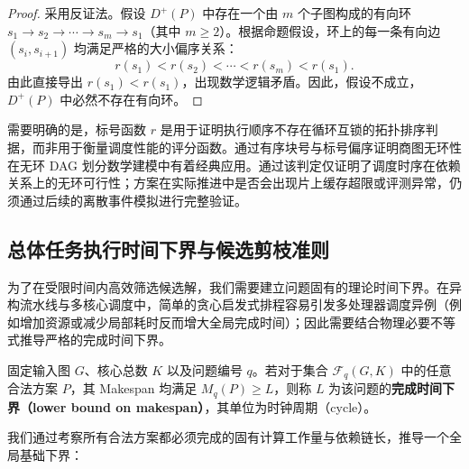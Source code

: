 \documentclass[anonymous,notoc]{gmcm2026}
\begin{document}
\begin{proof} 采用反证法。假设 \(D^+(P)\) 中存在一个由 \(m\) 个子图构成的有向环 \(s_1 \to s_2 \to \cdots \to s_m \to s_1\)（其中 \(m \ge 2\)）。根据命题假设，环上的每一条有向边 \((s_i, s_{i+1})\) 均满足严格的大小偏序关系： \begin{equation}
r(s_1) < r(s_2) < \cdots < r(s_m) < r(s_1).
\end{equation} 由此直接导出 \(r(s_1) < r(s_1)\)，出现数学逻辑矛盾。因此，假设不成立，\(D^+(P)\) 中必然不存在有向环。 \end{proof}

需要明确的是，标号函数 \(r\) 是用于证明执行顺序不存在循环互锁的拓扑排序判据，而非用于衡量调度性能的评分函数。通过有序块号与标号偏序证明商图无环性在无环 DAG 划分数学建模中有着经典应用\cite{ref7}。通过该判定仅证明了调度时序在依赖关系上的无环可行性；方案在实际推进中是否会出现片上缓存超限或评测异常，仍须通过后续的离散事件模拟进行完整验证。

\subsection{总体任务执行时间下界与候选剪枝准则}

为了在受限时间内高效筛选候选解，我们需要建立问题固有的理论时间下界。在异构流水线与多核心调度中，简单的贪心启发式排程容易引发多处理器调度异例（例如增加资源或减少局部耗时反而增大全局完成时间）\cite{ref2}；因此需要结合物理必要不等式推导严格的完成时间下界。

固定输入图 \(G\)、核心总数 \(K\) 以及问题编号 \(q\)。若对于集合 \(\mathcal{F}_q(G, K)\) 中的任意合法方案 \(P\)，其 Makespan 均满足 \(M_q(P) \ge L\)，则称 \(L\) 为该问题的\textbf{完成时间下界（lower bound on makespan）}，其单位为时钟周期（cycle）。

我们通过考察所有合法方案都必须完成的固有计算工作量与依赖链长，推导一个全局基础下界：
\end{document}
